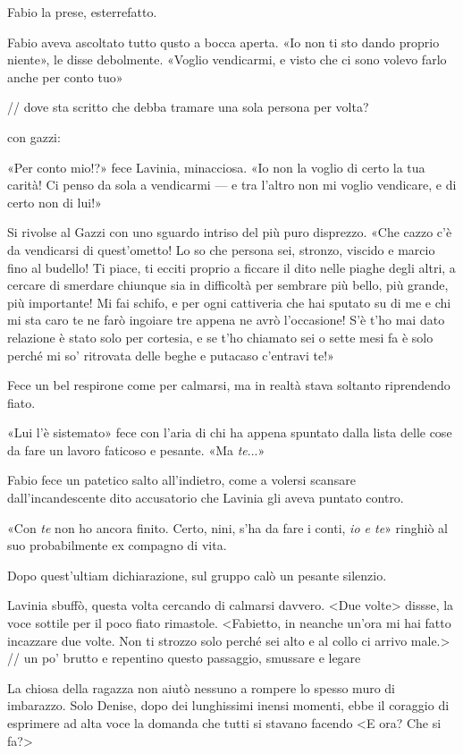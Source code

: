 Fabio la prese, esterrefatto.

Fabio aveva ascoltato tutto qusto a bocca aperta. «Io non ti sto dando proprio niente», le disse debolmente. «Voglio vendicarmi, e visto che ci sono volevo farlo anche per conto tuo»

// dove sta scritto che debba tramare una sola persona per volta?

con gazzi:

«Per conto mio!?» fece Lavinia, minacciosa. «Io non la voglio di certo la tua carità! Ci penso da sola a vendicarmi --- e tra l'altro non mi voglio vendicare, e di certo non di lui!»

Si rivolse al Gazzi con uno sguardo intriso del più puro disprezzo. «Che cazzo c'è da vendicarsi di quest'ometto! Lo so che persona sei, stronzo, viscido e marcio fino al budello! Ti piace, ti ecciti proprio a ficcare il dito nelle piaghe degli altri, a cercare di smerdare chiunque sia in difficoltà per sembrare più bello, più grande, più importante! Mi fai schifo, e per ogni cattiveria che hai sputato su di me e chi mi sta caro te ne farò ingoiare tre appena ne avrò l'occasione! S'è t'ho mai dato relazione è stato solo per cortesia, e se t'ho chiamato sei o sette mesi fa è solo perché mi so' ritrovata delle beghe e putacaso c'entravi te!»

Fece un bel respirone come per calmarsi, ma in realtà stava soltanto riprendendo fiato.

«Lui l'è sistemato» fece con l'aria di chi ha appena spuntato dalla lista delle cose da fare un lavoro faticoso e pesante. «Ma \emph{te}...»

Fabio fece un patetico salto all'indietro, come a volersi scansare dall'incandescente dito accusatorio che Lavinia gli aveva puntato contro.

«Con \emph{te} non ho ancora finito. Certo, nini, s'ha da fare i conti, \emph{io e te}» ringhiò al suo probabilmente ex compagno di vita.

Dopo quest'ultiam dichiarazione, sul gruppo calò un pesante silenzio.

Lavinia sbuffò, questa volta cercando di calmarsi davvero. <Due volte> dissse, la voce sottile per il poco fiato rimastole. <Fabietto, in neanche un'ora mi hai fatto incazzare due volte. Non ti strozzo solo perché sei alto e al collo ci arrivo male.>
// un po' brutto e repentino questo passaggio, smussare e legare

La chiosa della ragazza non aiutò nessuno a rompere lo spesso muro di imbarazzo. Solo Denise, dopo dei lunghissimi inensi momenti, ebbe il coraggio di esprimere ad alta voce la domanda che tutti si stavano facendo
<E ora? Che si fa?>

